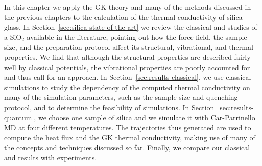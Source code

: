 
In this chapter we apply the \abinitio GK theory and many of the methods discussed in the previous chapters to the calculation of the thermal conductivity of silica glass. 
In Section~\ref{sec:silica-state-of-the-art} we review the classical and \abinitio studies of a-SiO$_2$ available in the literature, pointing out how the force field, the sample size, and the preparation protocol affect its structural, vibrational, and thermal properties. 
We find that although the structural properties are described fairly well by classical potentials, the vibrational properties are poorly accounted for and thus call for an \abinitio approach. 
In Section~\ref{sec:results-classical}, we use classical simulations to study the dependency of the computed thermal conductivity on many of the simulation parameters, such as the sample size and quenching protocol, and to determine the feasibility of \abinitio simulations. 
In Section~\ref{sec:results-quantum}, we choose one sample of silica and we simulate it with Car-Parrinello MD at four different temperatures. The trajectories thus generated are used to compute the \abinitio heat flux and the GK thermal conductivity, making use of many of the concepts and techniques discussed so far. Finally, we compare our classical and \abinitio results with experiments. 



